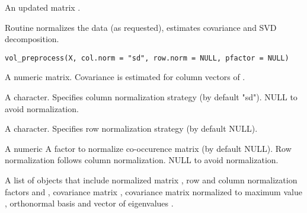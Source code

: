 \documentclass[letterpaper]{book}
\begin{document}
%
\begin{Value}
An updated matrix .
\end{Value}
%
\begin{Description}\relax
{} Routine normalizes the data (as requested), estimates covariance and SVD decomposition.
\end{Description}
%
\begin{Usage}
\begin{verbatim}
vol_preprocess(X, col.norm = "sd", row.norm = NULL, pfactor = NULL)
\end{verbatim}
\end{Usage}
%
\begin{Arguments}
\begin{ldescription}
\item[\code{X}] A numeric matrix. Covariance is estimated for column vectors of .

\item[\code{col.norm}] A character. Specifies column normalization strategy (by default "sd"). NULL to avoid normalization.

\item[\code{row.norm}] A character. Specifies row normalization strategy (by default NULL).

\item[\code{pfactor}] A numeric A factor to normalize co-occurence matrix (by default NULL).
Row normalization follows column normalization. NULL to avoid normalization.
\end{ldescription}
\end{Arguments}
%
\begin{Value}
A list of objects that include normalized matrix , row and column normalization factors  and ,
covariance matrix , covariance matrix  normalized to maximum value ,
orthonormal basis  and vector of eigenvalues .
\end{Value}
\printindex{}
\end{document}
